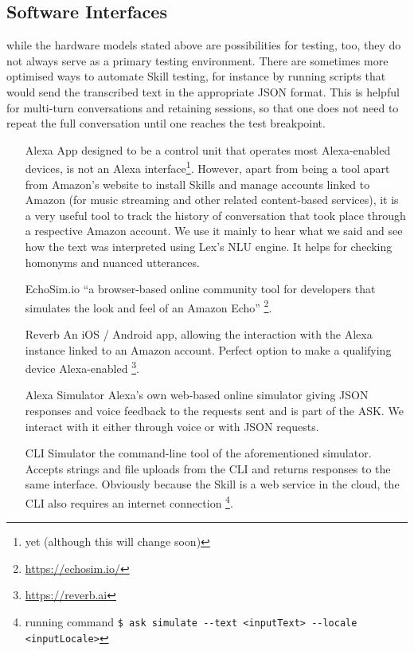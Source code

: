 

\subsection*{Software Interfaces}



while the hardware models stated above are possibilities for testing, too, they do not always serve as a primary testing environment. There are sometimes more optimised ways to automate Skill testing, for instance by running scripts that would send the transcribed text in the appropriate JSON format. This is helpful for multi-turn conversations and retaining sessions, so that one does not need to repeat the full conversation until one reaches the test breakpoint.

\begin{itemize}
	
	\item[Alexa App] designed to be a control unit that operates most Alexa-enabled devices, is not an Alexa interface\footnote{yet (although this will change soon)}. However, apart from being a tool apart from Amazon's website to install Skills and manage accounts linked to Amazon (for music streaming and other related content-based services), it is a very useful tool to track the history of conversation that took place through a respective Amazon account. We use it mainly to hear what we said and see how the text was interpreted using Lex's NLU engine. It helps for checking homonyms and nuanced utterances.
	
	
	\item[EchoSim.io] ``a browser-based online community tool for developers that simulates the look and feel of an Amazon Echo'' \footnote{\url{https://echosim.io/}}. %
	
	\item[Reverb] An iOS / Android app, allowing the interaction with the Alexa instance linked to an Amazon account. Perfect option to make a qualifying device Alexa-enabled \footnote{\url{https://reverb.ai}}. 
	
	\item[Alexa Simulator] Alexa's own web-based online simulator giving JSON responses and voice feedback to the requests sent and is part of the ASK. We interact with it either through voice or with JSON requests. 
	
	\item[CLI Simulator] the command-line tool of the aforementioned simulator. Accepts strings and file uploads from the CLI and returns responses to the same interface. Obviously because the Skill is a web service in the cloud, the CLI also requires an internet connection \footnote{running command \lstinline|$ ask simulate --text <inputText> --locale <inputLocale>|}.
	
\end{itemize}



